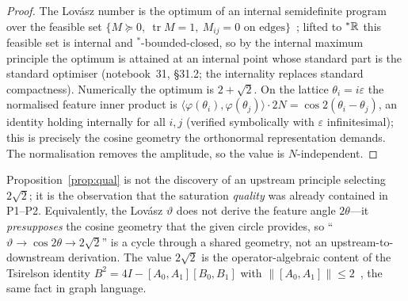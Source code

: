 \documentclass[11pt]{article}
\begin{document}
\begin{proof}
The Lov\'asz number is the optimum of an internal semidefinite program over the feasible set
$\{M\succeq0,\ \operatorname{tr}M=1,\ M_{ij}=0\text{ on edges}\}$~\cite{csw,rabelo}; lifted to ${}^{*}\mathbb{R}$ this
feasible set is internal and ${}^{*}$-bounded-closed, so by the internal maximum principle the
optimum is attained at an internal point whose standard part is the standard optimiser
(notebook~31, \S31.2; the internality replaces standard compactness). Numerically the optimum
is $2+\sqrt2$. On the lattice $\theta_i=i\varepsilon$ the normalised feature inner product is
$\langle\varphi(\theta_i),\varphi(\theta_j)\rangle\cdot2N=\cos2(\theta_i-\theta_j)$, an identity
holding internally for all $i,j$ (verified symbolically with $\varepsilon$ infinitesimal); this
is precisely the cosine geometry the orthonormal representation demands. The normalisation
removes the amplitude, so the value is $N$-independent.
\end{proof}

\begin{remark}\label{rem:redesc}
Proposition~\ref{prop:qual} is not the discovery of an upstream principle selecting $2\sqrt2$;
it is the observation that the saturation \emph{quality} was already contained in P1--P2.
Equivalently, the Lov\'asz $\vartheta$ does not derive the feature angle $2\theta$---it
\emph{presupposes} the cosine geometry that the given circle provides, so ``$\vartheta\to
\cos2\theta\to2\sqrt2$'' is a cycle through a shared geometry, not an upstream-to-downstream
derivation. The value $2\sqrt2$ is the operator-algebraic content of the Tsirelson identity
$B^2=4I-[A_0,A_1][B_0,B_1]$ with $\|[A_0,A_1]\|\le2$~\cite{tsirelson,landau}, the same fact in graph language.
\end{remark}
\end{document}
